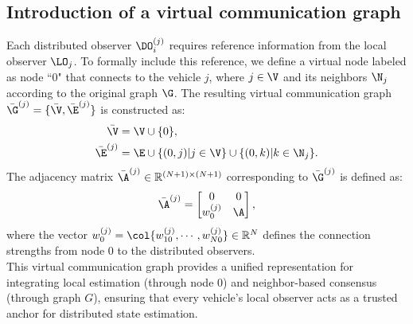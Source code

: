 \subsection{Introduction of a virtual communication graph}
\vspace*{-0.3cm}
Each distributed observer $\DO_{i}^{(j)}$ requires reference information from the local observer $\LO_{j}$.
    To formally include this reference, we define a virtual node labeled as node ``0" that connects to the vehicle $j$, where $j \in \V$ and its neighbors $\N_{j}$ according to the original graph $\G$. 
    The resulting virtual communication graph $\bar{\G}^{(j)} = \{ \bar{\V}, \bar{\E}^{(j)} \}$ is constructed as:
    \begin{equation}
        \begin{aligned}
            \bar{\V} &= \V \cup \{0\}, \\
            \bar{\E}^{(j)} &= \E \cup \{ (0,j) | j \in \V \} \cup \{ (0,k) | k \in \N_{j} \}.
        \end{aligned}
    \end{equation}
    The adjacency matrix $\bar{\A}^{(j)}  \in \mathbb{R}^{(N+1) \times (N+1)}$ corresponding to $\bar{\G}^{(j)}$ is defined as:
    \begin{equation}
        \bar{\A}^{(j)}  = \begin{bmatrix} 0 & 0 \\
                        w_{0}^{(j)} & \A \end{bmatrix},
    \end{equation}  
    where the vector $w_{0}^{(j)} = \col{w_{10}^{(j)}, \cdots, w_{N0}^{(j)}}  \in \mathbb{R}^{N}$ defines the connection strengths from node $0$ to the distributed observers.
    \\
    This virtual communication graph provides a unified representation for integrating local estimation (through node $0$) and neighbor-based consensus (through graph $G$), ensuring that every vehicle's local observer acts as a trusted anchor for distributed state estimation.








